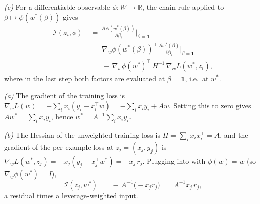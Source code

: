 \documentclass[11pt]{article}
\begin{document}
\begin{solution}[ex:if-derive]
\textit{(c)} For a differentiable observable $\phi:W\to\mathbb{R}$, the chain rule applied to $\beta\mapsto\phi(w^*(\beta))$ gives
\begin{align*}
  \mathcal{I}(z_i,\phi) &\;=\; \frac{\partial\,\phi(w^*(\beta))}{\partial \beta_i}\bigg\rvert_{\beta=\mathbf{1}} \\
  &\;=\; \nabla_w\phi(w^*(\beta))^\top\,\frac{\partial w^*(\beta)}{\partial \beta_i}\bigg\rvert_{\beta=\mathbf{1}} \\
  &\;=\; -\,\nabla_w\phi(w^*)^\top\,H^{-1}\,\nabla_w L(w^*,z_i),
\end{align*}
where in the last step both factors are evaluated at $\beta = \mathbf{1}$, i.e.\ at $w^*$.

\end{solution}

\begin{solution}[ex:ols-if]

\textit{(a)} The gradient of the training loss is $\nabla_w L(w) = -\sum_i x_i(y_i - x_i^\top w) = -\sum_i x_i y_i + Aw$. Setting this to zero gives $Aw^* = \sum_i x_i y_i$, hence $w^* = A^{-1}\sum_i x_i y_i$.

\textit{(b)} The Hessian of the unweighted training loss is $H = \sum_i x_i x_i^\top = A$, and the gradient of the per-example loss at $z_j = (x_j,y_j)$ is $\nabla_w L(w^*, z_j) = -x_j(y_j - x_j^\top w^*) = -x_j\,r_j$. Plugging into  with $\phi(w) = w$ (so $\nabla_w\phi(w^*) = I$),
\[
  \mathcal{I}(z_j, w^*) \;=\; -\,A^{-1}\bigl(-x_j r_j\bigr) \;=\; A^{-1} x_j\,r_j,
\]
a residual times a leverage-weighted input.


\end{solution}
\end{document}
